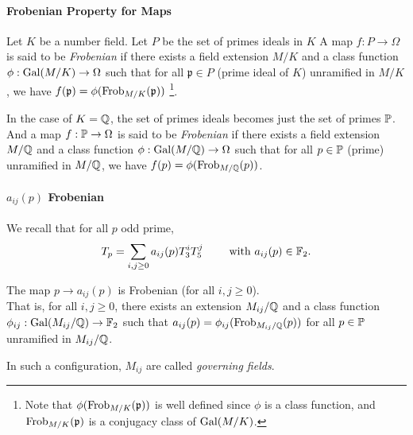 \paragraph{Frobenian Property for Maps}
Let $K$ be a number field. Let $P$ be the set of primes ideals in $K$
A map $f: P \to \Omega$ is said to be \textit{Frobenian} if there exists a field extension $M/K$ and a class function $\phi:\text{Gal}(M/K) \to \Omega$ such that for all $\mathfrak{p} \in P$ (prime ideal of $K$) unramified in $M/K$, we have $f(\mathfrak{p})=\phi(\text{Frob}_{M/K}(\mathfrak{p}))$
\footnote{Note that $\phi(\text{Frob}_{M/K}(\mathfrak{p}))$ is well defined since $\phi$ is a class function, and $\text{Frob}_{M/K}(\mathfrak{p})$ is a conjugacy class of $\text{Gal}(M/K)$.}.

In the case of $K=\mathbb{Q}$, the set of primes ideals becomes just the set of primes $\mathbb{P}$.
And a map $f: \mathbb{P} \to \Omega$ is said to be \textit{Frobenian} if there exists a field extension $M/\mathbb{Q}$ and a class function $\phi:\text{Gal}(M/\mathbb{Q}) \to \Omega$ such that for all $p \in \mathbb{P}$ (prime) unramified in $M/\mathbb{Q}$, we have $f(p)=\phi(\text{Frob}_{M/\mathbb{Q}}(p))$.

\paragraph{$a_{ij}(p)$ Frobenian}

We recall that for all $p$ odd prime, 
$$
T_p = \sum_{i,j \geq 0} a_{ij}(p)T_3^iT_5^j
\qquad \text{ with } a_{ij}(p) \in \mathbb{F}_2.
$$
\begin{theorem}
	The map $p \to a_{ij}(p)$ is Frobenian (for all $i,j \geq 0$).\\
	That is, for all $i,j \geq 0$, there exists an extension $M_{ij}/\mathbb{Q}$ and a class function $\phi_{ij}: \text{Gal}(M_{ij}/\mathbb{Q}) \to \mathbb{F}_2$ such that $a_{ij}(p)=\phi_{ij}(\text{Frob}_{M_{ij}/\mathbb{Q}}(p))$ for all $p \in \mathbb{P}$ unramified in $M_{ij}/\mathbb{Q}$.
\end{theorem}
In such a configuration, $M_{ij}$ are called \textit{governing fields}.

